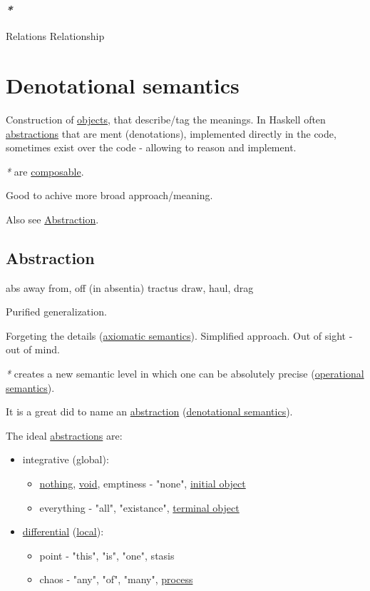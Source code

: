 \documentclass[a4paper,14pt,oneside]{book}
\begin{document}
\subsubsection{\emph{*}}
\label{sec:org951cced}

\label{org2906253}Relations
\label{orgd102818}Relationship

\section{\label{org8c1c1fa}Denotational semantics}
\label{sec:orgd5cd2a0}
Construction of \hyperref[orgde02dc0]{objects}, that describe/tag the meanings. In Haskell often \hyperref[org701d40d]{abstractions} that are ment (denotations), implemented directly in the code, sometimes exist over the code - allowing to reason and implement.

\emph{*} are \hyperref[orgefd2377]{composable}.

Good to achive more broad approach/meaning.

Also see \hyperref[orgfa1b674]{Abstraction}.

\subsection{\label{orgfa1b674}Abstraction}
\label{sec:org1e6aa31}
abs away from, off (in absentia)
tractus draw, haul, drag

Purified generalization.

Forgeting the details (\hyperref[org2171d2d]{axiomatic semantics}). Simplified approach. Out of sight - out of mind.

\emph{*} creates a new semantic level in which one can be absolutely precise (\hyperref[org1a29531]{operational semantics}).

It is a great did to name an \hyperref[orgfa1b674]{abstraction} (\hyperref[org8c1c1fa]{denotational semantics}).

The ideal \hyperref[org701d40d]{abstractions} are:
\begin{itemize}
\item integrative (global):
\begin{itemize}
\item \hyperref[org522d252]{nothing}, \hyperref[orgfca100c]{void}, emptiness - "none", \hyperref[org285dba8]{initial object}
\item everything - "all", "existance", \hyperref[org83d711d]{terminal object}
\end{itemize}
\item \hyperref[orga26c526]{differential} (\hyperref[orgb77a22c]{local}):
\begin{itemize}
\item point - "this", "is", "one", stasis
\item chaos - "any", "of", "many", \hyperref[org4a79554]{process}
\end{itemize}
\end{itemize}
\end{document}
